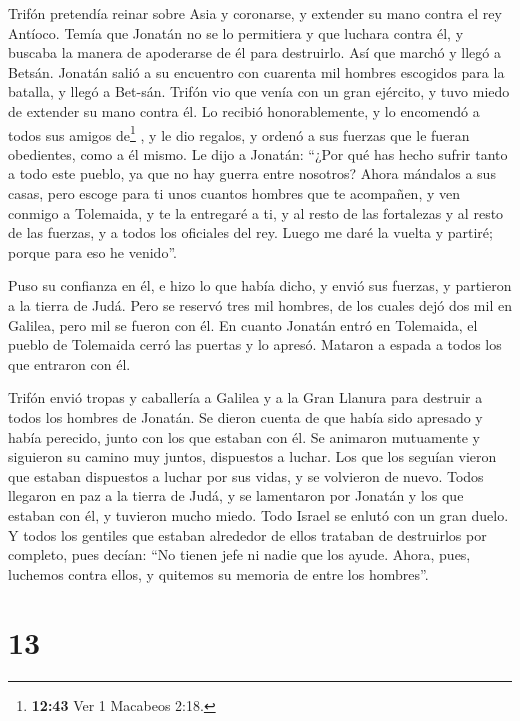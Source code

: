  Trifón pretendía reinar sobre Asia y coronarse, y
extender su mano contra el rey Antíoco.  Temía que
Jonatán no se lo permitiera y que luchara contra él, y buscaba la manera
de apoderarse de él para destruirlo. Así que marchó y llegó a Betsán.
 Jonatán salió a su encuentro con cuarenta mil hombres
escogidos para la batalla, y llegó a Bet-sán.  Trifón vio
que venía con un gran ejército, y tuvo miedo de extender su mano contra
él.  Lo recibió honorablemente, y lo encomendó a todos
sus amigos de\footnote{\textbf{12:43} Ver 1 Macabeos 2:18.} , y le dio
regalos, y ordenó a sus fuerzas que le fueran obedientes, como a él
mismo.  Le dijo a Jonatán: ``¿Por qué has hecho sufrir
tanto a todo este pueblo, ya que no hay guerra entre nosotros?
 Ahora mándalos a sus casas, pero escoge para ti unos
cuantos hombres que te acompañen, y ven conmigo a Tolemaida, y te la
entregaré a ti, y al resto de las fortalezas y al resto de las fuerzas,
y a todos los oficiales del rey. Luego me daré la vuelta y partiré;
porque para eso he venido''.

 Puso su confianza en él, e hizo lo que había dicho, y
envió sus fuerzas, y partieron a la tierra de Judá.  Pero
se reservó tres mil hombres, de los cuales dejó dos mil en Galilea, pero
mil se fueron con él.  En cuanto Jonatán entró en
Tolemaida, el pueblo de Tolemaida cerró las puertas y lo apresó. Mataron
a espada a todos los que entraron con él.

 Trifón envió tropas y caballería a Galilea y a la Gran
Llanura para destruir a todos los hombres de Jonatán.  Se
dieron cuenta de que había sido apresado y había perecido, junto con los
que estaban con él. Se animaron mutuamente y siguieron su camino muy
juntos, dispuestos a luchar.  Los que los seguían vieron
que estaban dispuestos a luchar por sus vidas, y se volvieron de nuevo.
 Todos llegaron en paz a la tierra de Judá, y se
lamentaron por Jonatán y los que estaban con él, y tuvieron mucho miedo.
Todo Israel se enlutó con un gran duelo.  Y todos los
gentiles que estaban alrededor de ellos trataban de destruirlos por
completo, pues decían: ``No tienen jefe ni nadie que los ayude. Ahora,
pues, luchemos contra ellos, y quitemos su memoria de entre los
hombres''.

\hypertarget{section-12}{%
\section{13}\label{section-12}}

